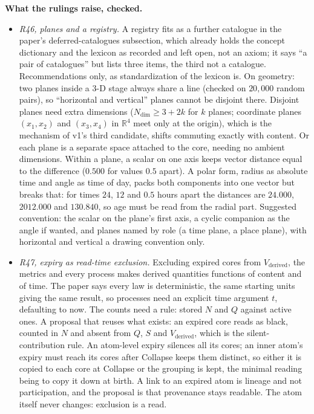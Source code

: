 \documentclass[11pt]{article}
\begin{document}
\textbf{What the rulings raise, checked.}
\begin{itemize}
\item \emph{R46, planes and a registry.} A registry fits as a further
catalogue in the paper's deferred-catalogues subsection, which already
holds the concept dictionary and the lexicon as recorded and left open, not
an axiom; it says ``a pair of catalogues'' but lists three items, the
third not a catalogue. Recommendations only, as standardization of the
lexicon is. On geometry: two planes inside a $3$-D stage always share a
line (checked on $20{,}000$ random pairs), so ``horizontal and vertical''
planes cannot be disjoint there. Disjoint planes need extra dimensions
($N_{\mathrm{dim}}\ge3+2k$ for $k$ planes; coordinate planes $(x_1,x_2)$
and $(x_3,x_4)$ in $\mathbb{R}^4$ meet only at the origin), which is the
mechanism of v1's third candidate, shifts commuting exactly with content.
Or each plane is a separate space attached to the core, needing no ambient
dimensions. Within a plane, a scalar on one axis keeps vector distance
equal to the difference ($0.500$ for values $0.5$ apart). A polar form,
radius as absolute time and angle as time of day, packs both components
into one vector but breaks that: for times $24$, $12$ and $0.5$ hours apart
the distances are $24.000$, $2012.000$ and $130.840$, so age must be read
from the radial part. Suggested convention: the scalar on the plane's
first axis, a cyclic companion as the angle if wanted, and planes named by
role (a time plane, a place plane), with horizontal and vertical a drawing
convention only.
\item \emph{R47, expiry as read-time exclusion.} Excluding expired cores
from $V_{\text{derived}}$, the metrics and every process makes derived
quantities functions of content and of time. The paper says every law is
deterministic, the same starting units giving the same result, so
processes need an explicit time argument $t$, defaulting to now. The
counts need a rule: stored $N$ and $Q$ against active ones. A proposal that
reuses what exists: an expired core reads as black, counted in $N$ and
absent from $Q$, $S$ and $V_{\text{derived}}$, which is the silent-contribution
rule. An atom-level expiry silences all its cores; an inner atom's expiry
must reach its cores after Collapse keeps them distinct, so either it is
copied to each core at Collapse or the grouping is kept, the minimal
reading being to copy it down at birth. A link to an expired atom is
lineage and not participation, and the proposal is that provenance stays
readable. The atom itself never changes: exclusion is a read.

\end{itemize}
\end{document}
